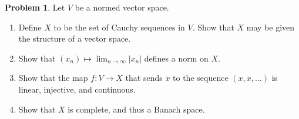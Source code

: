 \documentclass[11pt]{article}
\theoremstyle{definition}
\newtheorem{prob}{Problem}
\begin{document}
\begin{prob}
Let $V$ be a normed vector space.
\begin{enumerate}
\item
Define $X$ to be the set of Cauchy sequences in $V$.
Show that $X$ may be given the structure of a vector space.

\item
Show that $(x_n) \mapsto \lim_{n \to \infty} |x_n|$ defines a norm on $X$.

\item
Show that the map $f : V \to X$ that sends $x$ to the sequence $(x,x,\ldots)$
is linear, injective, and continuous.

\item
Show that $X$ is complete, and thus a Banach space.
\end{enumerate}
\end{prob}
\end{document}
